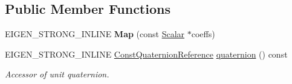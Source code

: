 \subsection*{Public Member Functions}
\begin{DoxyCompactItemize}
\item 
E\+I\+G\+E\+N\+\_\+\+S\+T\+R\+O\+N\+G\+\_\+\+I\+N\+L\+I\+NE {\bfseries Map} (const \hyperlink{class_eigen_1_1_map_3_01const_01_sophus_1_1_rx_s_o3_group_3_01___scalar_01_4_00_01___options_01_4_a1d6dec9e4f7cd797ae48d46a7f99daba}{Scalar} $\ast$coeffs)\hypertarget{class_eigen_1_1_map_3_01const_01_sophus_1_1_rx_s_o3_group_3_01___scalar_01_4_00_01___options_01_4_ad97a1ded3dc832e906ce893a08fa2270}{}\label{class_eigen_1_1_map_3_01const_01_sophus_1_1_rx_s_o3_group_3_01___scalar_01_4_00_01___options_01_4_ad97a1ded3dc832e906ce893a08fa2270}

\item 
E\+I\+G\+E\+N\+\_\+\+S\+T\+R\+O\+N\+G\+\_\+\+I\+N\+L\+I\+NE \hyperlink{class_eigen_1_1_map_3_01const_01_sophus_1_1_rx_s_o3_group_3_01___scalar_01_4_00_01___options_01_4_a324fba2fcc38f7b982b29894da76b1b2}{Const\+Quaternion\+Reference} \hyperlink{class_eigen_1_1_map_3_01const_01_sophus_1_1_rx_s_o3_group_3_01___scalar_01_4_00_01___options_01_4_a60393dbd35314cd4838d140fefd69604}{quaternion} () const 
\begin{DoxyCompactList}\small\item\em Accessor of unit quaternion. \end{DoxyCompactList}\end{DoxyCompactItemize}
